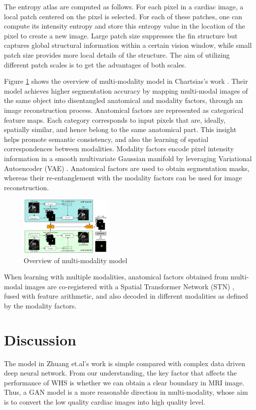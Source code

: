 \documentclass[10pt,sigconf,letterpaper,nonacm]{acmart}
\begin{document}
 The entropy atlas are computed as follows\cite{wachinger2012entropy}. For each pixel in a cardiac image, a local patch centered on the pixel is selected. For each of these patches, one can compute its intensity entropy and store this entropy value in the location of the pixel to create a new image. Large patch size suppresses the fin structure but captures global structural information within a certain vision window, while small patch size provides more local details of the structure. The aim of utilizing different patch scales is to get the advantages of both scales.

 Figure \ref{kaihuang_overview} shows the overview of multi-modality model in Chartsias's work \cite{chartsias2019multi}. Their model achieves higher segmentation accuracy by mapping multi-modal images of the same object into disentangled anatomical and modality factors, through an image reconstruction process. Anatomical factors are represented as categorical feature maps. Each category corresponds to input pixels that are, ideally, spatially similar, and hence belong to the same anatomical part. This insight helps promote semantic consistency, and also the learning of spatial correspondences between modalities. Modality factors encode pixel intensity information in a smooth multivariate Gaussian manifold by leveraging Variational Autoencoder (VAE) \cite{KingmaW13}. Anatomical factors are used to obtain segmentation masks, whereas their re-entanglement with the modality factors can be used for image reconstruction.
 
\begin{figure}
	\centering
	\includegraphics[width=0.4\textwidth]{images/kaihuang_overview.png}
	\caption{Overview of multi-modality model}
	\label{kaihuang_overview}
\end{figure} 
 When learning with multiple modalities, anatomical factors obtained from multi-modal images are co-registered with a Spatial Transformer Network (STN) \cite{JaderbergSZK15}, fused with feature arithmetic, and also decoded in different modalities as defined by the modality factors.
 
 
 \section{Discussion}
 The model in Zhuang et.al's work\cite{zhuang2016multi} is simple compared with complex data driven deep neural network. From our understanding, the key factor that affects the performance of WHS is whether we can obtain a clear boundary in MRI image. Thus, a GAN model is a more reasonable direction in multi-modality, whose aim is to convert the low quality cardiac images into high quality level.
 
\end{document}
